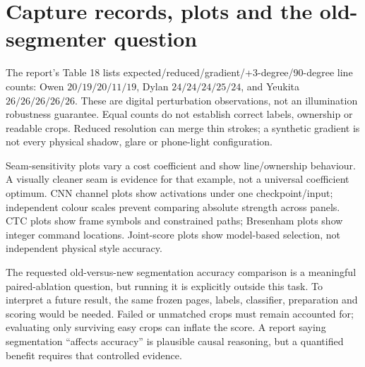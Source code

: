 \section{Capture records, plots and the old-segmenter question}
The report's Table 18 lists expected/reduced/gradient/+3-degree/90-degree
line counts: Owen $20/19/20/11/19$, Dylan $24/24/24/25/24$, and
Yeukita $26/26/26/26/26$. These are digital perturbation observations,
not an illumination robustness guarantee. Equal counts do not establish
correct labels, ownership or readable crops. Reduced resolution can merge
thin strokes; a synthetic gradient is not every physical shadow, glare or
phone-light configuration.

Seam-sensitivity plots vary a cost coefficient and show line/ownership
behaviour. A visually cleaner seam is evidence for that example, not a
universal coefficient optimum. CNN channel plots show activations under one
checkpoint/input; independent colour scales prevent comparing absolute
strength across panels. CTC plots show frame symbols and constrained paths;
Bresenham plots show integer command locations. Joint-score plots show
model-based selection, not independent physical style accuracy.

The requested old-versus-new segmentation accuracy comparison is a meaningful
paired-ablation question, but running it is explicitly outside this task.
To interpret a future result, the same frozen pages, labels, classifier,
preparation and scoring would be needed. Failed or unmatched crops must
remain accounted for; evaluating only surviving easy crops can inflate the
score. A report saying segmentation ``affects accuracy'' is plausible causal
reasoning, but a quantified benefit requires that controlled evidence.

